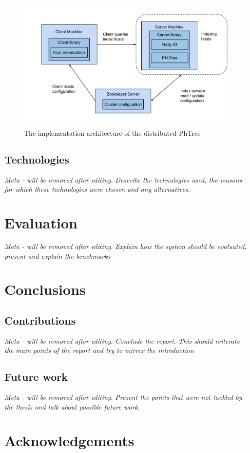 \documentclass[11pt,a4paper]{globis-book}
\begin{document}
\begin{figure}[h]
    \centering 
    \includegraphics[scale=0.4]{images/implementation-architecture}
    \caption{The implementation architecture of the distributed PhTree}
    \label{fig:implementation-architecture}
\end{figure}
\section{Technologies}
\textit{Meta - will be removed after editing.}
\textit{Describe the technologies used, the reasons for which these technologies were chosen and any alternatives.}

\chapter{Evaluation}
\label{ch:evaluation}

\textit{Meta - will be removed after editing.}
\textit{Explain how the system should be evaluated, present and explain the benchmarks}

\chapter{Conclusions}
\label{ch:conclusions}

\section{Contributions}
\label{sec:conclusions-contribution}
\textit{Meta - will be removed after editing.}
\textit{Conclude the report. This should reiterate the main points of the report and try to mirror the introduction}

\section{Future work}
\label{sec:conclusions-future-work}
\textit{Meta - will be removed after editing.}
\textit{Present the points that were not tackled by the thesis and talk about possible future work.}

\appendix

\listoffigures
\listoftables

\chapter*{Acknowledgements}

\newpage
\thispagestyle{empty}



\end{document}

